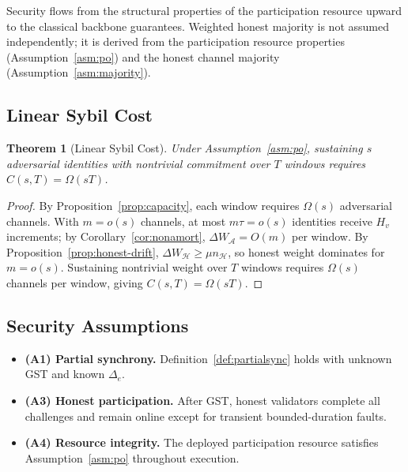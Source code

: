 \documentclass[10pt,journal,twoside]{IEEEtran}
\newtheorem{theorem}{Theorem}[section]
\theoremstyle{remark}
\begin{document}
	\noindent
	Security flows from the structural properties of the
	participation resource upward to the classical backbone
	guarantees.
	Weighted honest majority is not assumed independently;
	it is derived from the participation resource properties
	(Assumption~\ref{asm:po}) and the honest channel majority
	(Assumption~\ref{asm:majority}).
	
	\subsection{Linear Sybil Cost}
	\label{ssec:linear}
	
	\begin{theorem}[Linear Sybil Cost]
		\label{thm:linear}
		Under Assumption~\ref{asm:po}, sustaining $s$
		adversarial identities with nontrivial commitment
		over $T$ windows requires $C(s,T) = \Omega(sT)$.
	\end{theorem}
	
	\begin{proof}
		By Proposition~\ref{prop:capacity}, each window requires
		$\Omega(s)$ adversarial channels.
		With $m = o(s)$ channels, at most $m\tau = o(s)$
		identities receive $H_v$ increments;
		by Corollary~\ref{cor:nonamort},
		$\Delta W_{\mathcal{A}} = O(m)$ per window.
		By Proposition~\ref{prop:honest-drift},
		$\Delta W_{\mathcal{H}} \geq \mu n_{\mathcal{H}}$,
		so honest weight dominates for $m = o(s)$.
		Sustaining nontrivial weight over $T$ windows requires
		$\Omega(s)$ channels per window, giving
		$C(s,T) = \Omega(sT)$.
	\end{proof}
	
	\subsection{Security Assumptions}
	\label{ssec:assumptions}
	
	\begin{itemize}
		\item \textbf{(A1) Partial synchrony.}
		Definition~\ref{def:partialsync} holds with unknown
		GST and known $\Delta_e$.
		
		\item \textbf{(A3) Honest participation.}
		After GST, honest validators complete all challenges
		and remain online except for transient bounded-duration
		faults.
		
		\item \textbf{(A4) Resource integrity.}
		The deployed participation resource satisfies
		Assumption~\ref{asm:po} throughout execution.
	\end{itemize}
	
\end{document}
